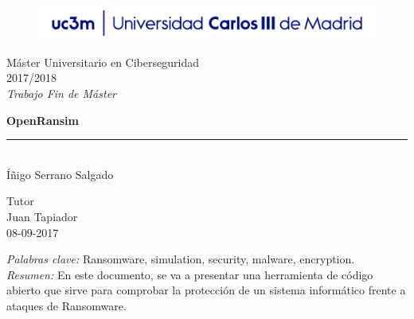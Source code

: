 \documentclass[a4paper,12pt]{article}
\begin{document}
\begin{titlepage}
\begin{sffamily}
\color{azulUC3M}
\begin{center}
\begin{figure}[htb]
\begin{center}
\vspace*{0.6cm}
\includegraphics[width=15cm]{imagenes/Portada_Logo.png}
\vspace*{1.6cm}
\end{center}
\end{figure}
\begin{LARGE}
Máster Universitario en Ciberseguridad \\
2017/2018 \\
\vspace*{1cm}
\textsl{Trabajo Fin de Máster}\\
\end{LARGE}
\Huge{\textbf{OpenRansim}}\\
\vspace*{1cm}
\rule{80mm}{0.1mm}\\
\huge{Íñigo Serrano Salgado}\\ 
\vspace*{0.5cm}
\begin{Large}
Tutor\\
Juan Tapiador\\
08-09-2017\\
\end{Large}
\end{center}
\vspace*{2cm}
\color{black}
\emph{Palabras clave:} Ransomware, simulation, security, malware, encryption. \\
\emph{Resumen:} En este documento, se va a presentar una herramienta de código abierto que sirve para comprobar la protección de un sistema informático frente a ataques de Ransomware.\\

\end{sffamily}
\end{titlepage}

\pagestyle{fancy}
\fancyhead{} 
\setlength\headheight{21.2pt}
\end{document}
